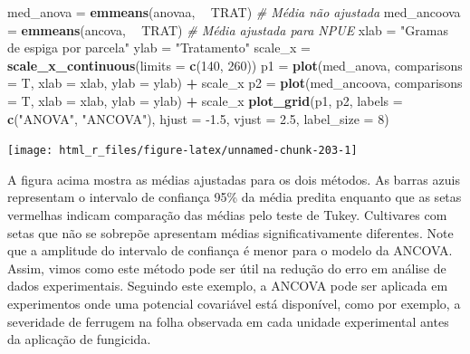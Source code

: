 \documentclass[
]{book}
\newenvironment{Shaded}{\begin{snugshade}}{\end{snugshade}}
\newcommand{\CommentTok}[1]{\textcolor[rgb]{0.56,0.35,0.01}{\textit{#1}}}
\newcommand{\DataTypeTok}[1]{\textcolor[rgb]{0.13,0.29,0.53}{#1}}
\newcommand{\DecValTok}[1]{\textcolor[rgb]{0.00,0.00,0.81}{#1}}
\newcommand{\FloatTok}[1]{\textcolor[rgb]{0.00,0.00,0.81}{#1}}
\newcommand{\KeywordTok}[1]{\textcolor[rgb]{0.13,0.29,0.53}{\textbf{#1}}}
\newcommand{\NormalTok}[1]{#1}
\newcommand{\OperatorTok}[1]{\textcolor[rgb]{0.81,0.36,0.00}{\textbf{#1}}}
\newcommand{\StringTok}[1]{\textcolor[rgb]{0.31,0.60,0.02}{#1}}
\begin{document}
\begin{Shaded}
\begin{Highlighting}[]
\NormalTok{med_anova =}\StringTok{ }\KeywordTok{emmeans}\NormalTok{(anovaa, }\OperatorTok{~}\StringTok{ }\NormalTok{TRAT) }\CommentTok{# Média não ajustada}
\NormalTok{med_ancoova =}\StringTok{ }\KeywordTok{emmeans}\NormalTok{(ancova, }\OperatorTok{~}\StringTok{ }\NormalTok{TRAT) }\CommentTok{# Média ajustada para NPUE}
\NormalTok{xlab =}\StringTok{ "Gramas de espiga por parcela"}
\NormalTok{ylab =}\StringTok{ "Tratamento"}
\NormalTok{scale_x =}\StringTok{ }\KeywordTok{scale_x_continuous}\NormalTok{(}\DataTypeTok{limits =} \KeywordTok{c}\NormalTok{(}\DecValTok{140}\NormalTok{, }\DecValTok{260}\NormalTok{))}
\NormalTok{p1 =}\StringTok{ }\KeywordTok{plot}\NormalTok{(med_anova, }\DataTypeTok{comparisons =}\NormalTok{ T, }\DataTypeTok{xlab =}\NormalTok{ xlab, }\DataTypeTok{ylab =}\NormalTok{ ylab) }\OperatorTok{+}\StringTok{ }\NormalTok{scale_x}
\NormalTok{p2 =}\StringTok{ }\KeywordTok{plot}\NormalTok{(med_ancoova, }\DataTypeTok{comparisons =}\NormalTok{ T, }\DataTypeTok{xlab =}\NormalTok{ xlab, }\DataTypeTok{ylab =}\NormalTok{ ylab) }\OperatorTok{+}\StringTok{ }\NormalTok{scale_x}
\KeywordTok{plot_grid}\NormalTok{(p1, p2, }\DataTypeTok{labels =} \KeywordTok{c}\NormalTok{(}\StringTok{"ANOVA"}\NormalTok{, }\StringTok{"ANCOVA"}\NormalTok{),}
          \DataTypeTok{hjust =} \FloatTok{-1.5}\NormalTok{, }\DataTypeTok{vjust =} \FloatTok{2.5}\NormalTok{, }\DataTypeTok{label_size =} \DecValTok{8}\NormalTok{)}
\end{Highlighting}
\end{Shaded}

\begin{center}\texttt{[image: html\_r\_files/figure-latex/unnamed-chunk-203-1]} \end{center}

A figura acima mostra as médias ajustadas para os dois métodos. As barras azuis representam o intervalo de confiança 95\% da média predita enquanto que as setas vermelhas indicam comparação das médias pelo teste de Tukey. Cultivares com setas que não se sobrepõe apresentam médias significativamente diferentes. Note que a amplitude do intervalo de confiança é menor para o modelo da ANCOVA. Assim, vimos como este método pode ser útil na redução do erro em análise de dados experimentais. Seguindo este exemplo, a ANCOVA pode ser aplicada em experimentos onde uma potencial covariável está disponível, como por exemplo, a severidade de ferrugem na folha observada em cada unidade experimental antes da aplicação de fungicida.
\end{document}

